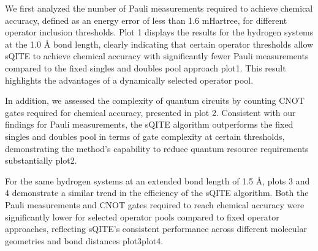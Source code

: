 \documentclass[aip,jcp,amsmath,amssymb, reprint]{revtex4-1}
\begin{document}

We first analyzed the number of Pauli measurements required to achieve chemical accuracy, defined as an energy error of less than 1.6 mHartree, for different operator inclusion thresholds. Plot 1 displays the results for the hydrogen systems at the 1.0 Å bond length, clearly indicating that certain operator thresholds allow sQITE to achieve chemical accuracy with significantly fewer Pauli measurements compared to the fixed singles and doubles pool approach {plot1}. This result highlights the advantages of a dynamically selected operator pool.

In addition, we assessed the complexity of quantum circuits by counting CNOT gates required for chemical accuracy, presented in plot 2. Consistent with our findings for Pauli measurements, the sQITE algorithm outperforms the fixed singles and doubles pool in terms of gate complexity at certain thresholds, demonstrating the method's capability to reduce quantum resource requirements substantially {plot2}.

For the same hydrogen systems at an extended bond length of 1.5 Å, plots 3 and 4 demonstrate a similar trend in the efficiency of the sQITE algorithm. Both the Pauli measurements and CNOT gates required to reach chemical accuracy were significantly lower for selected operator pools compared to fixed operator approaches, reflecting sQITE's consistent performance across different molecular geometries and bond distances {plot3}{plot4}.
\end{document}
